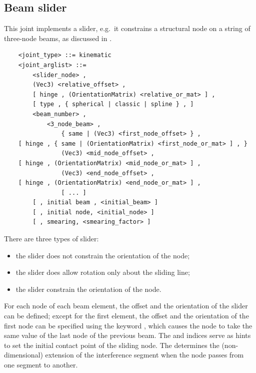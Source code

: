 \subsection{Beam slider}
This joint implements a slider, e.g.\ it constrains a structural node 
on a string of three-node beams, as discussed in \cite{SLIDER-AIDAA-2003}.
\begin{verbatim}
    <joint_type> ::= kinematic
    <joint_arglist> ::=
        <slider_node> ,
        (Vec3) <relative_offset> ,
        [ hinge , (OrientationMatrix) <relative_or_mat> ] ,
        [ type , { spherical | classic | spline } , ]
        <beam_number> ,
            <3_node_beam> ,
                { same | (Vec3) <first_node_offset> } ,
    [ hinge , { same | (OrientationMatrix) <first_node_or_mat> ] , }
                (Vec3) <mid_node_offset> ,
    [ hinge , (OrientationMatrix) <mid_node_or_mat> ] ,
                (Vec3) <end_node_offset> ,
    [ hinge , (OrientationMatrix) <end_node_or_mat> ] ,
                [ ... ]
        [ , initial beam , <initial_beam> ]
        [ , initial node, <initial_node> ]
        [ , smearing, <smearing_factor> ]
\end{verbatim}
There are three types of slider:
\begin{itemize}
	\item the  slider does not constrain
	the orientation of the node;
	\item the  slider does allow rotation
	only about the sliding line;
	\item the  slider constrain the orientation
	of the node.
\end{itemize}
For each node of each beam element, the offset and the orientation
of the slider can be defined; except for the first element, the
offset and the orientation of the first node can be specified using
the keyword , which causes the node to take the same
value of the last node of the previous beam.
The  and  indices
serve as hints to set the initial contact point of the sliding node.
The  determines the (non-dimensional) extension
of the interference segment when the node passes from one segment
to another. %



